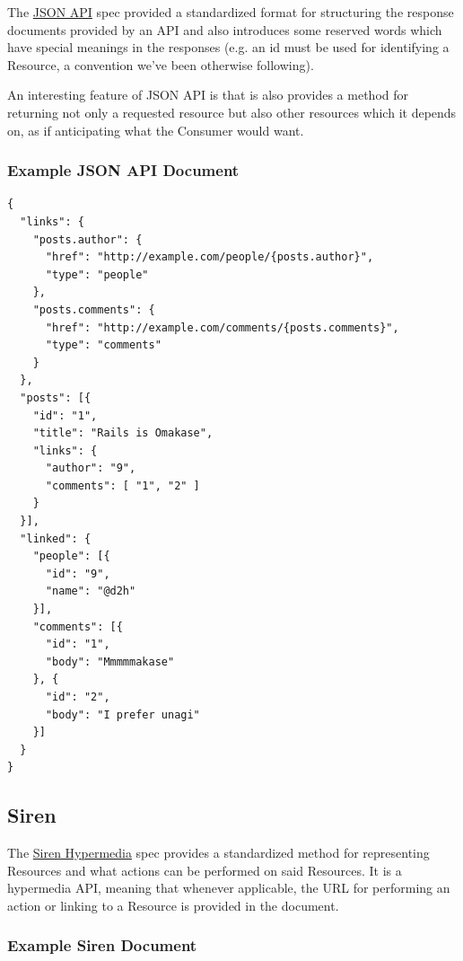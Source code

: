 \documentclass{book}
\begin{document}
The \href{http://jsonapi.org/}{JSON API} spec provided a standardized format for structuring the response documents provided by an API and also introduces some reserved words which have special meanings in the responses (e.g. an id must be used for identifying a Resource, a convention we've been otherwise following).

An interesting feature of JSON API is that is also provides a method for returning not only a requested resource but also other resources which it depends on, as if anticipating what the Consumer would want.

\subsubsection{Example JSON API Document}

\begin{verbatim}
{
  "links": {
    "posts.author": {
      "href": "http://example.com/people/{posts.author}",
      "type": "people"
    },
    "posts.comments": {
      "href": "http://example.com/comments/{posts.comments}",
      "type": "comments"
    }
  },
  "posts": [{
    "id": "1",
    "title": "Rails is Omakase",
    "links": {
      "author": "9",
      "comments": [ "1", "2" ]
    }
  }],
  "linked": {
    "people": [{
      "id": "9",
      "name": "@d2h"
    }],
    "comments": [{
      "id": "1",
      "body": "Mmmmmakase"
    }, {
      "id": "2",
      "body": "I prefer unagi"
    }]
  }
}
\end{verbatim}

\subsection{Siren}

The \href{http://sirenspec.org}{Siren Hypermedia} spec provides a standardized method for representing Resources and what actions can be performed on said Resources. It is a hypermedia API, meaning that whenever applicable, the URL for performing an action or linking to a Resource is provided in the document.

\subsubsection{Example Siren Document}
\end{document}
